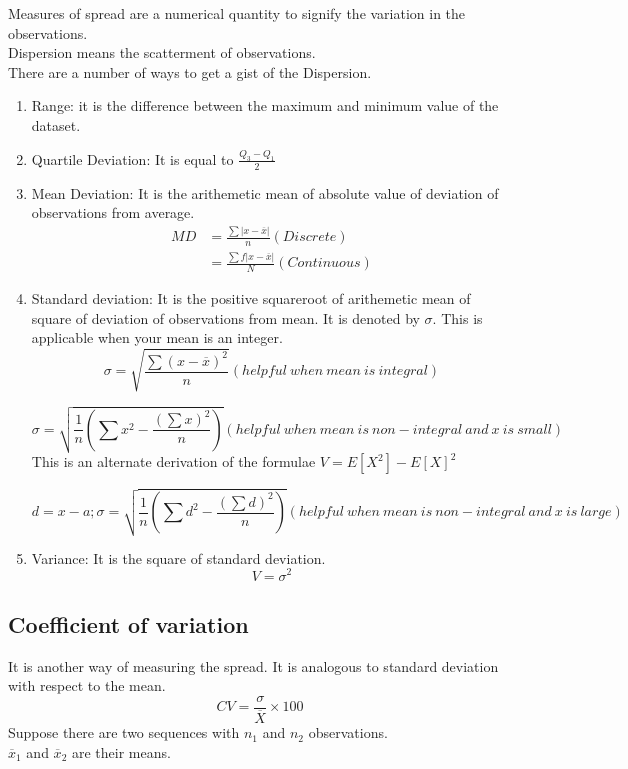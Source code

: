 \documentclass[11pt,letterpaper]{article}
\begin{document}
Measures of spread are a numerical quantity to signify the variation in the observations.\\
Dispersion means the scatterment of observations. \\
There are a number of ways to get a gist of the Dispersion. 

\begin{enumerate}
  \item Range: it is the difference between the maximum and minimum value of the dataset. 
  \item Quartile Deviation: It is equal to $\frac{Q_3-Q_1}{2}$
  \item Mean Deviation: It is the arithemetic mean of absolute value of deviation of observations from average. 
    \begin{align*}
      MD &= \frac{\sum \lvert x - \overline{x} \rvert}{n} ( Discrete )\\
         &=  \frac{\sum f \lvert x - \overline{x} \rvert}{N} ( Continuous )
    \end{align*}
  \item Standard deviation: It is the positive squareroot of arithemetic mean of square of deviation of observations 
    from mean. It is denoted by $\sigma$. This is applicable when your mean is an integer.
    \[
      \sigma = \sqrt{\frac{\sum (x - \overline{x})^2}{n}} ( helpful\ when\ mean\ is\ integral )
    \]

    \[
      \sigma = \sqrt{\frac{1}{n}\left( \sum x^2 - \frac{(\sum x)^2}{n}\right)} ( helpful\ when\ mean\ is\ non-integral\ and\ x\ is\ small )
    \]
    This is an alternate derivation of the formulae $V = E[X^2]-E[X]^2$

    \[
      d = x-a; 
      \sigma = \sqrt{\frac{1}{n}\left( \sum d^2 - \frac{(\sum d)^2}{n}\right)} ( helpful\ when\ mean\ is\ non-integral\ and\ x\ is\ large )
    \]
  \item Variance: It is the square of standard deviation. 
    \[
      V = \sigma^2 
    \]
\end{enumerate}

\subsection{Coefficient of variation}
It is another way of measuring the spread. It is analogous to standard deviation with respect to the mean. 
\[
  CV = \frac{\sigma}{\overline{X}} \times 100
\]
Suppose there are two sequences with $n_1$ and $n_2$ observations. \\ 
$\overline{x}_1$ and $\overline{x}_2$ are their means. \\ 
\end{document}
